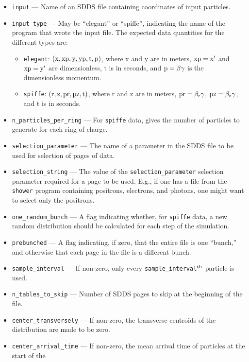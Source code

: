 \documentclass[11pt]{article}
\begin{document}
\begin{itemize}
\item \verb|input| --- Name of an  SDDS file containing coordinates of input particles.
\item \verb|input_type| --- May be ``elegant'' or ``spiffe'', indicating the name of the
program that wrote the input file.  The expected data quantities for the different types are:
    \begin{itemize}
    \item {\tt elegant}:  ${\rm (x, xp, y, yp, t, p)}$, where x and y are in meters, ${\rm xp=x^\prime}$
and ${\rm xp=y^\prime}$ are dimensionless, t is in seconds, and ${\rm p=\beta\gamma}$ is the dimensionless
momentum.
\item {\tt spiffe}: ${\rm (r, z, pr, pz, t)}$, where r and z are in meters, ${\rm pr=\beta_r \gamma}$,
  ${\rm pz = \beta_z \gamma}$, and t is in seconds.
\end{itemize}
\item \verb|n_particles_per_ring| --- For {\tt spiffe} data, gives the number of particles to
generate for each ring of charge.
\item \verb|selection_parameter| --- The name of a parameter in the SDDS file to be used for selection
of pages of data.
\item \verb|selection_string| --- The value of the
\verb|selection_parameter| selection parameter required for a page to
be used.  E.g., if one has a file from the {\tt shower} program
containing positrons, electrons, and photons, one might want to select
only the positrons.
\item \verb|one_random_bunch| --- A flag indicating whether, for {\tt spiffe} data, a new random
distribution should be calculated for each step of the simulation.
\item \verb|prebunched| --- A flag indicating, if zero, that the entire file is one ``bunch,'' and otherwise that each page in the file is a different bunch.
\item \verb|sample_interval| --- If non-zero, only every \verb|sample_interval|$^{\rm th}$ particle is used.
\item \verb|n_tables_to_skip| --- Number of SDDS pages to skip at the beginning of the file.
\item \verb|center_transversely| --- If non-zero, the transverse centroids of the distribution are made to be zero.
\item \verb|center_arrival_time| --- If non-zero, the mean arrival time of particles at the start of the

\end{itemize}
\end{document}
